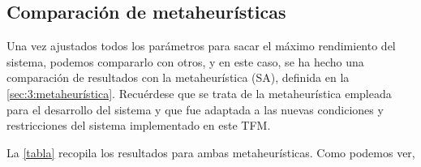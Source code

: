 \subsection{Comparación de metaheurísticas}
Una vez ajustados todos los parámetros para sacar el máximo rendimiento del sistema, podemos compararlo con otros, y en este caso, se ha hecho una comparación de resultados con la metaheurística \sa{} (SA), definida en la \autoref{sec:3:metaheurística}. Recuérdese que se trata de la metaheurística empleada para el desarrollo del sistema \legacy{} y que fue adaptada a las nuevas condiciones y restricciones del sistema implementado en este TFM.

La \autoref{tabla} recopila los resultados para ambas metaheurísticas. Como podemos ver, %

